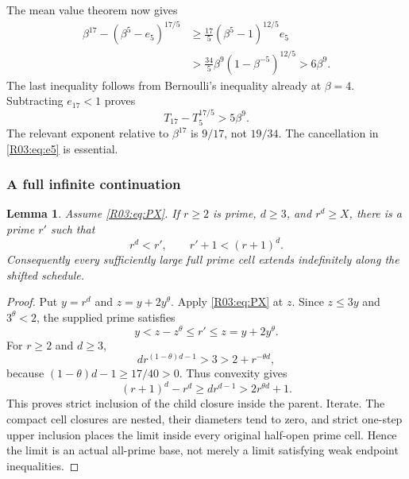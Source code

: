 \documentclass[11pt,a4paper]{article}
\newtheorem{lemma}[theorem]{Lemma}\newtheorem{proposition}[theorem]{Proposition}
\theoremstyle{definition}\newtheorem{definition}[theorem]{Definition}
\theoremstyle{remark}\newtheorem{remark}[theorem]{Remark}
\begin{document}
The mean value theorem now gives
\[
 \begin{aligned}
 \beta^{17}-(\beta^5-e_5)^{17/5}
 &\ge\frac{17}{5}(\beta^5-1)^{12/5}e_5\\
 &>\frac{34}{5}\beta^9(1-\beta^{-5})^{12/5}
 >6\beta^9.
 \end{aligned}
\]
The last inequality follows from Bernoulli's inequality already at
$\beta=4$. Subtracting $e_{17}<1$ proves
\begin{equation}\label{R03:eq:firstwindow}
 \boxed{T_{17}-T_5^{17/5}>5\beta^9.}
\end{equation}
The relevant exponent relative to $\beta^{17}$ is $9/17$, not
$19/34$. The cancellation in \eqref{R03:eq:e5} is essential.

\subsubsection{A full infinite continuation}

\begin{lemma}\label{R03:lem:extension}
Assume \eqref{R03:eq:PX}. If $r\ge2$ is prime, $d\ge3$, and $r^d\ge X$,
there is a prime $r'$ such that
\[
 r^d<r',\qquad r'+1<(r+1)^d.
\]
Consequently every sufficiently large full prime cell extends
indefinitely along the shifted schedule.
\end{lemma}
\begin{proof}
Put $y=r^d$ and $z=y+2y^\theta$. Apply \eqref{R03:eq:PX} at $z$.
Since $z\le3y$ and $3^\theta<2$, the supplied prime satisfies
\[
 y<z-z^\theta\le r'\le z=y+2y^\theta.
\]
For $r\ge2$ and $d\ge3$,
\[
 d r^{(1-\theta)d-1}>3>2+r^{-\theta d},
\]
because $(1-\theta)d-1\ge17/40>0$. Thus convexity gives
\[
 (r+1)^d-r^d\ge d r^{d-1}>2r^{\theta d}+1.
\]
This proves strict inclusion of the child closure inside the parent.
Iterate. The compact cell closures are nested, their diameters tend
to zero, and strict one-step upper inclusion places the limit inside
every original half-open prime cell. Hence the limit is an actual
all-prime base, not merely a limit satisfying weak endpoint inequalities.
\end{proof}
\end{document}
